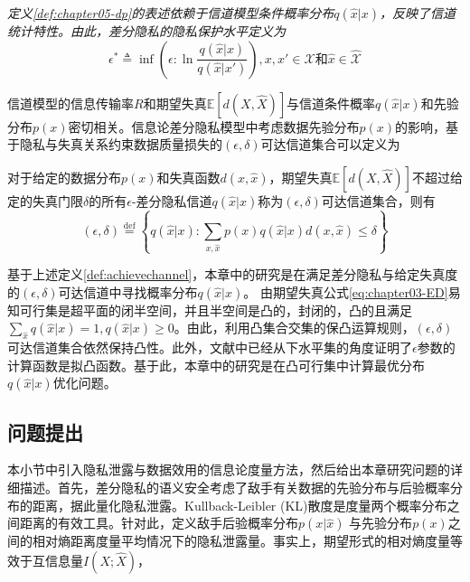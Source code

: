 \begin{remark}
{\em 定义\textup{\ref{def:chapter05-dp}}的表述依赖于信道模型条件概率分布$q(\hat{x}|x)$，反映了信道统计特性。由此，差分隐私的隐私保护水平定义为
\begin{equation}\label{eq:chapter05-epsilon}
	\epsilon^{*}\triangleq \inf \left(\epsilon: \ln \frac{q(\hat{x}|x)}{q(\hat{x}|x')}\right),x,x'\in \mathcal{X}\text{和}\hat{x}\in \mathcal{\hat{X}}
\end{equation}
}
\end{remark}
信道模型的信息传输率$R$和期望失真$\mathbb{E}\left[d(X,\hat{X})\right]$与信道条件概率$q(\hat{x}|x)$和先验分布$p(x)$密切相关。信息论差分隐私模型中考虑数据先验分布$p(x)$的影响，基于隐私与失真关系约束数据质量损失的$(\epsilon,\delta)$可达信道集合可以定义为

\begin{definition}\label{def:achievechannel}对于给定的数据分布$p(x)$和失真函数$d(x,\hat{x})$，期望失真$\mathbb{E}\left[d(X,\hat{X})\right]$不超过给定的失真门限$\delta$的所有$\epsilon$-差分隐私信道$q(\hat{x}|x)$称为$(\epsilon,\delta)$可达信道集合，则有
	\begin{equation}
		(\epsilon,\delta)\stackrel{\text{def}}{=} \left\{q(\hat{x}|x):\sum_{x,\hat{x}}p(x)q(\hat{x}|x)d(x,\hat{x})\leq \delta\right\}
	\end{equation}
\end{definition}

基于上述定义\ref{def:achievechannel}，本章中的研究是在满足差分隐私与给定失真度的$(\epsilon,\delta)$可达信道中寻找概率分布$q(\hat{x}|x)$。 由期望失真公式\ref{eq:chapter03-ED}易知可行集是超平面的闭半空间，并且半空间是凸的\cite{boyd2004convex}，封闭的，凸的且满足$\sum_{\hat{x}}q(\hat{x}|x)=1, q(\hat{x}|x)\geq 0$。由此，利用凸集合交集的保凸运算规则，$(\epsilon,\delta)$可达信道集合依然保持凸性。此外，文献中已经从下水平集的角度证明了$\epsilon$参数的计算函数是拟凸函数。基于此，本章中的研究是在凸可行集中计算最优分布$q(\hat{x}|x)$优化问题。



\subsection{问题提出}\label{chapter05-problem-statement}

本小节中引入隐私泄露与数据效用的信息论度量方法，然后给出本章研究问题的详细描述。首先，差分隐私的语义安全考虑了敌手有关数据的先验分布与后验概率分布的距离，据此量化隐私泄露。Kullback-Leibler (KL)散度是度量两个概率分布之间距离的有效工具\cite{cover2006elements}。针对此，定义敌手后验概率分布$p(x|\hat{x})$ 与先验分布$p(x)$之间的相对熵距离度量平均情况下的隐私泄露量。事实上，期望形式的相对熵度量等效于互信息量$I(X;\hat{X})$\cite{calmon2012privacy}，

